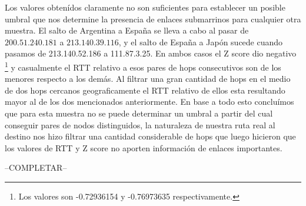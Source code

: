 \par Los valores obten\'idos claramente no son suficientes para establecer un posible umbral que nos determine la presencia de enlaces submarrinos para cualquier otra muestra. El salto de Argentina a Espa\~na se lleva a cabo al pasar de $200.51.240.181$ a $213.140.39.116$, y el salto de Espa\~na a Jap\'on sucede cuando pasamos de 213.140.52.186 a 111.87.3.25. En ambos casos el Z score dio negativo \footnote{Los valores son -0.72936154 y -0.76973635 respectivamente.} y casualmente el RTT relativo a esos pares de hops consecutivos son de los menores respecto a los dem\'as. Al filtrar una gran cantidad de hops en el medio de dos hops cercanos geograficamente el RTT relativo de ellos esta resultando mayor al de los dos mencionados anteriormente. \newline
En base a todo esto conclu\'imos que para esta muestra no se puede determinar un umbral a partir del cual conseguir pares de nodos distinguidos, la naturaleza de nuestra ruta real al destino nos hizo filtrar una cantidad considerable de hops que luego hicieron que los valores de RTT y Z score no aporten informaci\'on de enlaces importantes. 






--COMPLETAR--
